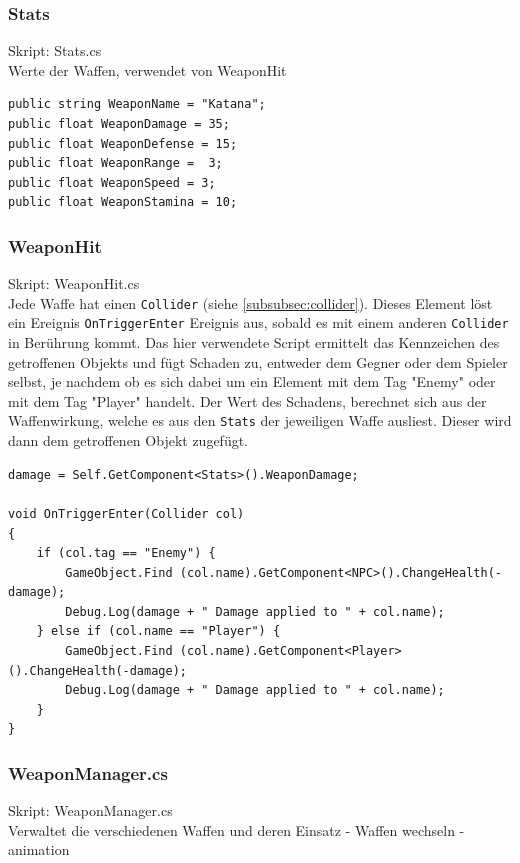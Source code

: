 \subsubsection{Stats}
Skript: Stats.cs\\
Werte der Waffen, verwendet von WeaponHit

\begin{lstlisting}
public string WeaponName = "Katana";
public float WeaponDamage = 35;
public float WeaponDefense = 15;
public float WeaponRange =	3;
public float WeaponSpeed = 3;
public float WeaponStamina = 10;
\end{lstlisting}


\subsubsection{WeaponHit}
Skript: WeaponHit.cs\\

Jede Waffe hat einen \lstinline{Collider} (siehe \cref{subsubsec:collider}). Dieses Element löst ein Ereignis \lstinline{OnTriggerEnter} Ereignis aus, sobald es mit einem anderen \lstinline{Collider} in Berührung kommt.
Das hier verwendete Script ermittelt das Kennzeichen des getroffenen Objekts und fügt Schaden zu, entweder dem Gegner oder dem Spieler selbst, je nachdem ob es sich dabei um ein Element mit dem Tag "Enemy" oder mit dem Tag "Player" handelt.
Der Wert des Schadens, berechnet sich aus der Waffenwirkung, welche es aus den \lstinline{Stats} der jeweiligen Waffe ausliest. Dieser wird dann dem getroffenen Objekt zugefügt.

\begin{lstlisting}[caption={Waffentreffer}]
damage = Self.GetComponent<Stats>().WeaponDamage;

void OnTriggerEnter(Collider col)
{
	if (col.tag == "Enemy") {
		GameObject.Find (col.name).GetComponent<NPC>().ChangeHealth(-damage);
		Debug.Log(damage + " Damage applied to " + col.name);
	} else if (col.name == "Player") {
		GameObject.Find (col.name).GetComponent<Player>().ChangeHealth(-damage);
		Debug.Log(damage + " Damage applied to " + col.name);
	}
}
\end{lstlisting}

\subsubsection{WeaponManager.cs}
Skript: WeaponManager.cs\\
Verwaltet die verschiedenen Waffen und deren Einsatz
- Waffen wechseln
- animation

